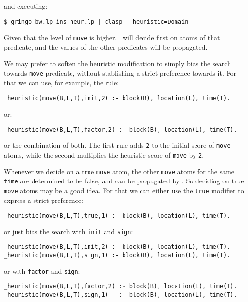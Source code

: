 and executing:
\begin{lstlisting}[numbers=none]
$ gringo bw.lp ins heur.lp | clasp --heuristic=Domain \end{lstlisting}

Given that the level of \texttt{move} is higher,  \clasp\ will decide first on atoms of that predicate,
and the values of the other predicates will be propagated.

We may prefer to soften the heuristic modification to simply bias the search  towards \texttt{move} predicate,
without stablishing a strict preference towards it.  For that we can use, for example, the rule:
\begin{lstlisting}[numbers=none]
_heuristic(move(B,L,T),init,2) :- block(B), location(L), time(T).\end{lstlisting} or:
\begin{lstlisting}[numbers=none]
_heuristic(move(B,L,T),factor,2) :- block(B), location(L), time(T).\end{lstlisting}

or the combination of both.  The first rule adds \texttt{2} to the initial score of \texttt{move} atoms,
while the second multiplies the heuristic score of \texttt{move} by \texttt{2}.

Whenever we decide on a true \texttt{move} atom,  the other \texttt{move} atoms for the same \texttt{time} are determined to be false,
and can be propagated by \clasp. So deciding on true \texttt{move} atoms may be a good idea.
For that we can either use the \texttt{true} modifier to express a strict preference:
\begin{lstlisting}[numbers=none]
_heuristic(move(B,L,T),true,1) :- block(B), location(L), time(T).\end{lstlisting}

or just bias the search with \texttt{init} and \texttt{sign}:
\begin{lstlisting}[numbers=none]
_heuristic(move(B,L,T),init,2) :- block(B), location(L), time(T).
_heuristic(move(B,L,T),sign,1) :- block(B), location(L), time(T).\end{lstlisting}

or with \texttt{factor} and \texttt{sign}:
\begin{lstlisting}[numbers=none]
_heuristic(move(B,L,T),factor,2) :- block(B), location(L), time(T).
_heuristic(move(B,L,T),sign,1)   :- block(B), location(L), time(T).\end{lstlisting}



